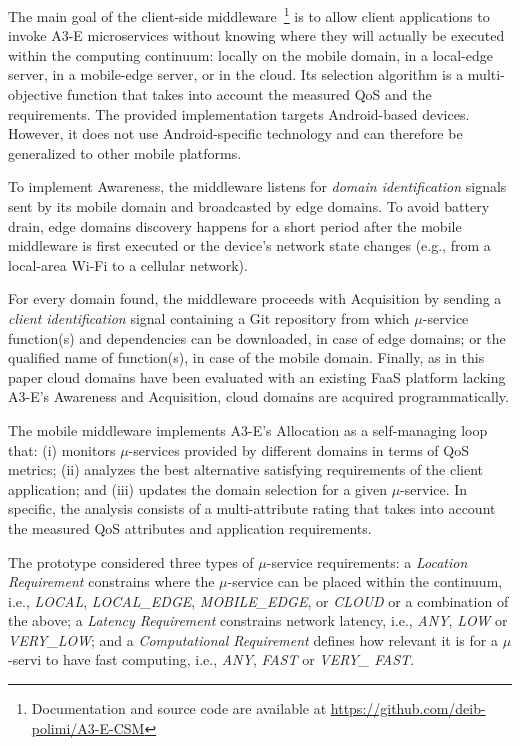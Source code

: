 The main goal of the client-side middleware~\footnote{Documentation and source code are available at \url{https://github.com/deib-polimi/A3-E-CSM}} is to allow client applications to invoke A3-E microservices without knowing where they will actually be executed within the computing continuum: locally on the mobile domain, in a local-edge server, in a mobile-edge server, or in the cloud. Its selection algorithm is a multi-objective function that takes into account the measured QoS and the requirements. The provided implementation targets Android-based devices. However, it does not use Android-specific technology and can therefore be generalized to other mobile platforms. 

To implement Awareness, the middleware listens for \textit{domain identification} signals sent by its mobile domain and broadcasted by edge domains. To avoid battery drain, edge domains discovery happens for a short period after the mobile middleware is first executed or the device's network state changes (e.g., from a local-area Wi-Fi to a cellular network). 

For every domain found, the middleware proceeds with Acquisition by sending a \textit{client identification} signal containing a Git repository from which $\mu$-service function(s) and dependencies can be downloaded, in case of edge domains; or the qualified name of function(s), in case of the mobile domain. Finally, as in this paper cloud domains have been evaluated with an existing FaaS platform lacking A3-E's Awareness and Acquisition, cloud domains are acquired programmatically.



The mobile middleware implements A3-E's Allocation as a self-managing loop that: (i) monitors $\mu$-services provided by different domains in terms of QoS metrics; (ii) analyzes the best alternative satisfying requirements of the client application; and (iii) updates the domain selection for a given $\mu$-service. In specific, the analysis consists of a multi-attribute rating that takes into account the measured QoS attributes and application requirements.

The prototype considered three types of $\mu$-service requirements: a \textit{Location Requirement} constrains where the $\mu$-service can be placed within the continuum, i.e., \textit{LOCAL}, \textit{LOCAL\_EDGE}, \textit{MOBILE\_EDGE}, or \textit{CLOUD} or a combination of the above;  a \textit{Latency Requirement} constrains network latency, i.e., \textit{ANY}, \textit{LOW} or \textit{VERY\_LOW}; and a \textit{Computational Requirement} defines how relevant it is for a $\mu$-servi to have fast computing, i.e., \textit{ANY}, \textit{FAST} or \textit{VERY\_ FAST}. 

